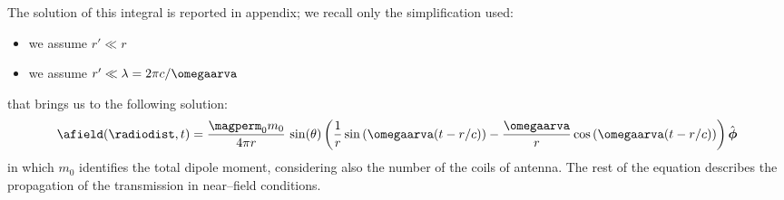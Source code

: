 The solution of this integral is reported in appendix; we recall only the simplification used:
\begin{itemize}
\item we assume $r' \ll r$
\item we assume $r' \ll \lambda = 2\pi c/\omegaarva$
\end{itemize}
that brings us to the following solution:
\begin{equation}
\label{eq:soluzioneint}
\afield(\radiodist,t) = \dfrac{\magperm_0 m_0}{4\pi r}\,\sin(\theta)\left( \dfrac{1}{r} \sin\left(\omegaarva(t-r/c)\right) - \dfrac{\omegaarva}{r}\cos\left(\omegaarva(t-r/c)\right)\right)\hat{\boldsymbol{\phi}}
\end{equation}
in which $m_0$ identifies the total dipole moment, considering also the number of the coils of antenna. The rest of the equation describes the propagation of the transmission in near--field conditions.

